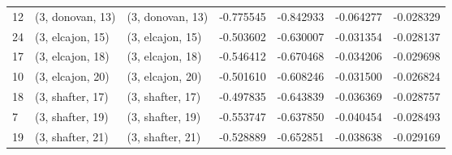 \begin{tabular}{lllrrrr}
12 &  (3, donovan, 13) &  (3, donovan, 13) & -0.775545 & -0.842933 &  -0.064277 & -0.028329 \\
24 &  (3, elcajon, 15) &  (3, elcajon, 15) & -0.503602 & -0.630007 &  -0.031354 & -0.028137 \\
17 &  (3, elcajon, 18) &  (3, elcajon, 18) & -0.546412 & -0.670468 &  -0.034206 & -0.029698 \\
10 &  (3, elcajon, 20) &  (3, elcajon, 20) & -0.501610 & -0.608246 &  -0.031500 & -0.026824 \\
18 &  (3, shafter, 17) &  (3, shafter, 17) & -0.497835 & -0.643839 &  -0.036369 & -0.028757 \\
7  &  (3, shafter, 19) &  (3, shafter, 19) & -0.553747 & -0.637850 &  -0.040454 & -0.028493 \\
19 &  (3, shafter, 21) &  (3, shafter, 21) & -0.528889 & -0.652851 &  -0.038638 & -0.029169 \\
\bottomrule
\end{tabular}
